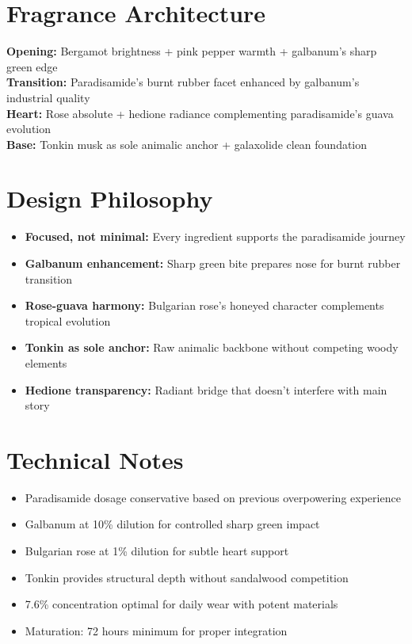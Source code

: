 \documentclass{article}
\begin{document}
\section{Fragrance Architecture}
\textbf{Opening:} Bergamot brightness + pink pepper warmth + galbanum's sharp green edge \\
\textbf{Transition:} Paradisamide's burnt rubber facet enhanced by galbanum's industrial quality \\
\textbf{Heart:} Rose absolute + hedione radiance complementing paradisamide's guava evolution \\
\textbf{Base:} Tonkin musk as sole animalic anchor + galaxolide clean foundation

\section{Design Philosophy}
\begin{itemize}
\item \textbf{Focused, not minimal:} Every ingredient supports the paradisamide journey
\item \textbf{Galbanum enhancement:} Sharp green bite prepares nose for burnt rubber transition
\item \textbf{Rose-guava harmony:} Bulgarian rose's honeyed character complements tropical evolution
\item \textbf{Tonkin as sole anchor:} Raw animalic backbone without competing woody elements
\item \textbf{Hedione transparency:} Radiant bridge that doesn't interfere with main story
\end{itemize}

\section{Technical Notes}
\begin{itemize}
\item Paradisamide dosage conservative based on previous overpowering experience
\item Galbanum at 10\% dilution for controlled sharp green impact
\item Bulgarian rose at 1\% dilution for subtle heart support
\item Tonkin provides structural depth without sandalwood competition
\item 7.6\% concentration optimal for daily wear with potent materials
\item Maturation: 72 hours minimum for proper integration
\end{itemize}
\end{document}

